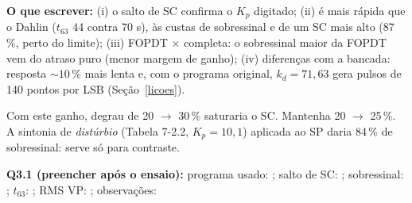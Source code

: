 \documentclass[11pt,a4paper]{article}
\begin{document}
\textbf{O que escrever:} (i) o salto de SC confirma o $K_p$ digitado; (ii) é mais rápida que o Dahlin ($t_{63}$ 44 contra 70 s), às custas de sobressinal e de um SC mais alto (87\,\%, perto do limite); (iii) FOPDT $\times$ completa: o sobressinal maior da FOPDT vem do atraso puro (menor margem de ganho); (iv) diferenças com a bancada: resposta $\sim10\,\%$ mais lenta e, com o programa original, $k_d=71{,}63$ gera pulsos de 140 pontos por LSB (Seção~\ref{licoes}).
\begin{alerta}Com este ganho, degrau de 20 $\to$ 30\,\% saturaria o SC. Mantenha 20 $\to$ 25\,\%. A sintonia de \emph{distúrbio} (Tabela 7-2.2, $K_p=10{,}1$) aplicada ao SP daria 84\,\% de sobressinal: serve só para contraste.\end{alerta}
\begin{real}\textbf{Q3.1 (preencher após o ensaio):} programa usado: \underline{\hspace{3cm}}; salto de SC: \underline{\hspace{1.5cm}}; sobressinal: \underline{\hspace{1.5cm}}; $t_{63}$: \underline{\hspace{1.5cm}}; RMS VP: \underline{\hspace{1.5cm}}; observações: \underline{\hspace{5cm}}\end{real}
\end{document}
